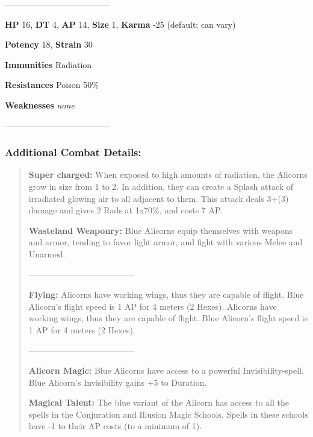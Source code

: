 \documentclass[11pt,a4paper,twocolumn]{book}
\begin{document}
	--------------------------------------
	
	\noindent
	\textbf{HP} 16, \textbf{DT} 4, \textbf{AP} 14, \textbf{Size} 1, \textbf{Karma} -25 (default; can vary)
	
	\noindent
	\textbf{Potency} 18, \textbf{Strain} 30
	
	\noindent
	\textbf{Immunities} Radiation
	
	\noindent
	\textbf{Resistances} Poison 50\%
	
	\noindent
	\textbf{Weaknesses} \emph{none} %
	
	--------------------------------------
	
	\subsubsection*{Additional Combat Details:}
	\begin{verse}
		
		\textbf{Super charged:} When exposed to high amounts of radiation, the Alicorns grow in size from 1 to 2. In addition, they can create a Splash attack of irradiated glowing air to all adjacent to them. This attack deals 3+(3) damage and gives 2 Rads at 1x70\%, and costs 7 AP.
		
		\textbf{Wasteland Weaponry:} Blue Alicorns equip themselves with weapons and armor, tending to favor light armor, and fight with various Melee and Unarmed.
		
		--------------------------------------
		
		\textbf{Flying:} Alicorns have working wings, thus they are capable of flight. Blue Alicorn's flight speed is 1 AP for 4 meters (2 Hexes). Alicorns have working wings, thus they are capable of flight. Blue Alicorn's flight speed is 1 AP for 4 meters (2 Hexes).
		
		--------------------------------------
		
		\textbf{Alicorn Magic:} Blue Alicorns have access to a powerful Invisibility-spell. Blue Alicorn's Invisibility gains +5 to Duration.
		
		\textbf{Magical Talent:} The blue variant of the Alicorn has access to all the spells in the Conjuration and Illusion Magic Schools. Spells in these schools have -1 to their AP costs (to a minimum of 1).
		
		
		
	\end{verse}
	
\end{document}
